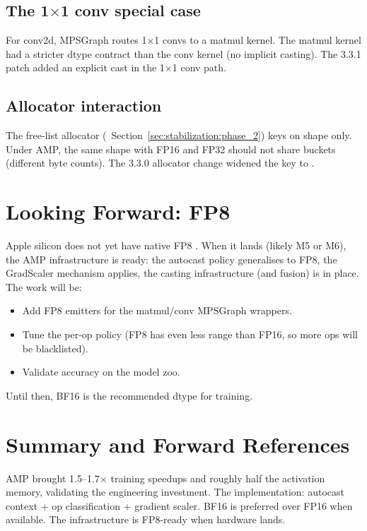 \subsection{The 1$\times$1 conv special case}
\label{ssec:amp_integration:1x1_conv}

For conv2d, MPSGraph routes 1$\times$1 convs to a matmul kernel.
The matmul kernel had a stricter dtype contract than the conv
kernel (no implicit casting). The 3.3.1 patch added an explicit
cast in the 1$\times$1 conv path.

\subsection{Allocator interaction}
\label{ssec:amp_integration:allocator_interaction}

The free-list allocator
(~Section~\ref{sec:stabilization:phase_2})
keys on shape only. Under AMP, the same shape with FP16 and FP32
should not share buckets (different byte counts). The 3.3.0
allocator change widened the key to .

\section{Looking Forward: FP8}
\label{sec:amp_integration:fp8_outlook}

Apple silicon does not yet have native FP8 \cite{micikevicius_fp8_2022}.
When it lands (likely M5 or M6), the AMP infrastructure is
ready: the autocast policy generalises to FP8, the GradScaler
mechanism applies, the casting infrastructure (and fusion) is
in place. The work will be:
\begin{itemize}
  \item Add FP8 emitters for the matmul/conv MPSGraph wrappers.
  \item Tune the per-op policy (FP8 has even less range than
    FP16, so more ops will be blacklisted).
  \item Validate accuracy on the model zoo.
\end{itemize}

Until then, BF16 is the recommended dtype for training.

\section{Summary and Forward References}
\label{sec:amp_integration:summary}

AMP brought 1.5--1.7$\times$ training speedups and roughly half
the activation memory, validating the engineering investment.
The implementation: autocast context + op classification +
gradient scaler. BF16 is preferred over FP16 when available.
The infrastructure is FP8-ready when hardware lands.

